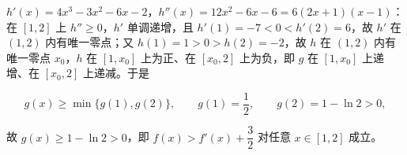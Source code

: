 \begin{answer}
\(h'(x)=4x^{3}-3x^{2}-6x-2\)，\(h''(x)=12x^{2}-6x-6=6(2x+1)(x-1)\)：在 \([1,2]\) 上 \(h''\geqslant 0\)，\(h'\) 单调递增，且 \(h'(1)=-7<0<h'(2)=6\)，故 \(h'\) 在 \((1,2)\) 内有唯一零点；又 \(h(1)=1>0>h(2)=-2\)，故 \(h\) 在 \((1,2)\) 内有唯一零点 \(x_{0}\)，\(h\) 在 \([1,x_{0}]\) 上为正、在 \([x_{0},2]\) 上为负，即 \(g\) 在 \([1,x_{0}]\) 上递增、在 \([x_{0},2]\) 上递减。于是

\nopagebreak[4]
\[
g(x)\geqslant\min\{g(1),g(2)\},\qquad g(1)=\dfrac{1}{2},\qquad g(2)=1-\ln 2>0,
\]

故 \(g(x)\geqslant 1-\ln 2>0\)，即 \(f(x)>f'(x)+\dfrac{3}{2}\) 对任意 \(x\in[1,2]\) 成立。



\end{answer}
